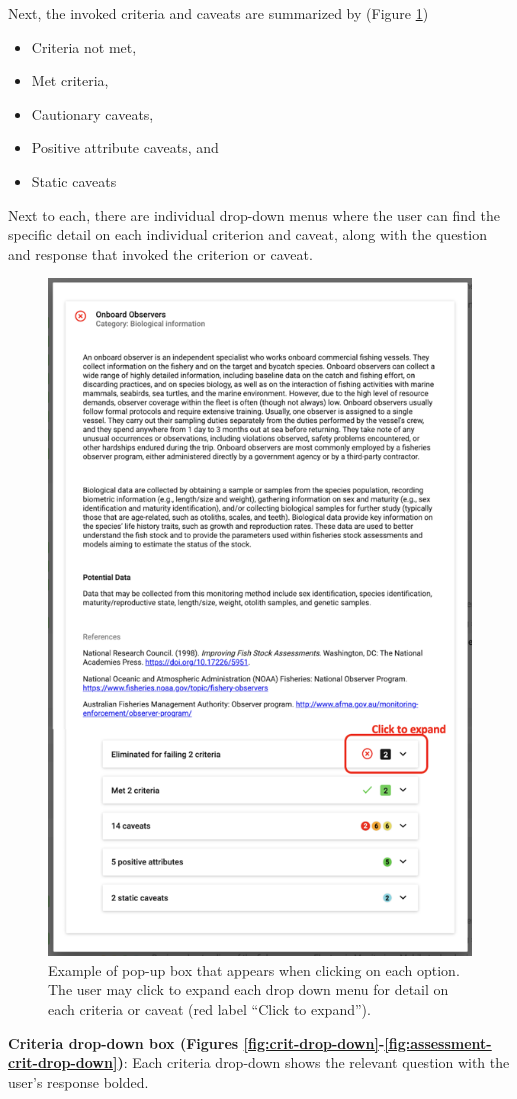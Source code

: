 \documentclass[
  11pt,
]{book}
\providecommand{\tightlist}{%
  \setlength{\itemsep}{0pt}\setlength{\parskip}{0pt}}
\begin{document}
Next, the invoked criteria and caveats are summarized by (Figure \ref{fig:opt-desc})

\begin{itemize}
\tightlist
\item
  Criteria not met,
\item
  Met criteria,
\item
  Cautionary caveats,
\item
  Positive attribute caveats, and
\item
  Static caveats
\end{itemize}

Next to each, there are individual drop-down menus where the user can find the specific detail on each individual criterion and caveat, along with the question and response that invoked the criterion or caveat.

\begin{figure}

{\centering \includegraphics[width=0.5\linewidth]{images/option-description} 

}

\caption{Example of pop-up box that appears when clicking on each option. The user may click to expand each drop down menu for detail on each criteria or caveat (red label “Click to expand”).}\label{fig:opt-desc}
\end{figure}

\textbf{Criteria drop-down box (Figures \ref{fig:crit-drop-down}-\ref{fig:assessment-crit-drop-down})}: Each criteria drop-down shows the relevant question with the user's response bolded.
\end{document}

